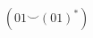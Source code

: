 \documentclass[preview]{standalone}
\begin{document}
        \color{white}  %
        \begin{equation*}
        (01 \smile (01)^*)
        \end{equation*}
        
\end{document}
